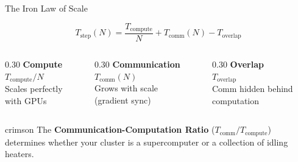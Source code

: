 \documentclass[aspectratio=169, 12pt]{beamer}
\newcommand{\CCR}{Communication-Computation Ratio}
\begin{document}
\begin{frame}{The Iron Law of Scale}

\small
$$T_{\text{step}}(N) = \frac{T_{\text{compute}}}{N} + T_{\text{comm}}(N) - T_{\text{overlap}}$$

\vspace{0.1cm}
\begin{columns}[T]
  \begin{column}{0.30\textwidth}
    \centering
    \textcolor{computestroke}{\textbf{Compute}}\\[0.05cm]
    {\scriptsize $T_{\text{compute}}/N$\\Scales perfectly\\with GPUs}
  \end{column}
  \begin{column}{0.30\textwidth}
    \centering
    \textcolor{errorstroke}{\textbf{Communication}}\\[0.05cm]
    {\scriptsize $T_{\text{comm}}(N)$\\Grows with scale\\(gradient sync)}
  \end{column}
  \begin{column}{0.30\textwidth}
    \centering
    \textcolor{datastroke}{\textbf{Overlap}}\\[0.05cm]
    {\scriptsize $T_{\text{overlap}}$\\Comm hidden behind\\computation}
  \end{column}
\end{columns}

\vspace{0.2cm}
\begin{mlsyscard}{crimson}
The \textbf{\CCR{}} ($T_{\text{comm}}/T_{\text{compute}}$) determines whether your cluster is a supercomputer or a collection of idling heaters.
\end{mlsyscard}

\end{frame}
\end{document}
